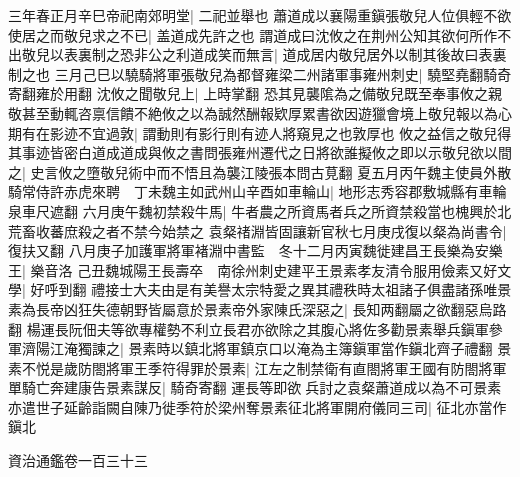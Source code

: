 三年春正月辛巳帝祀南郊明堂|{
	二祀並舉也}
蕭道成以襄陽重鎭張敬兒人位俱輕不欲使居之而敬兒求之不已|{
	盖道成先許之也}
謂道成曰沈攸之在荆州公知其欲何所作不出敬兒以表裏制之恐非公之利道成笑而無言|{
	道成居内敬兒居外以制其後故曰表裏制之也}
三月己巳以驍騎將軍張敬兒為都督雍梁二州諸軍事雍州刺史|{
	驍堅堯翻騎奇寄翻雍於用翻}
沈攸之聞敬兒上|{
	上時掌翻}
恐其見襲隂為之備敬兒既至奉事攸之親敬甚至動輒咨禀信饋不絶攸之以為誠然酬報欵厚累書欲因遊獵會境上敬兒報以為心期有在影迹不宜過敦|{
	謂動則有影行則有迹人將窺見之也敦厚也}
攸之益信之敬兒得其事迹皆密白道成道成與攸之書問張雍州遷代之日將欲誰擬攸之即以示敬兒欲以間之|{
	史言攸之墮敬兒術中而不悟且為襲江陵張本問古莧翻}
夏五月丙午魏主使員外散騎常侍許赤虎來聘　丁未魏主如武州山辛酉如車輪山|{
	地形志秀容郡敷城縣有車輪泉車尺遮翻}
六月庚午魏初禁殺牛馬|{
	牛者農之所資馬者兵之所資禁殺當也槐興於北荒畜收蕃庶殺之者不禁今始禁之}
袁粲禇淵皆固讓新官秋七月庚戌復以粲為尚書令|{
	復扶又翻}
八月庚子加護軍將軍褚淵中書監　冬十二月丙寅魏徙建昌王長樂為安樂王|{
	樂音洛}
己丑魏城陽王長壽卒　南徐州刺史建平王景素孝友清令服用儉素又好文學|{
	好呼到翻}
禮接士大夫由是有美譽太宗特愛之異其禮秩時太祖諸子俱盡諸孫唯景素為長帝凶狂失德朝野皆屬意於景素帝外家陳氏深惡之|{
	長知两翻屬之欲翻惡烏路翻}
楊運長阮佃夫等欲專權勢不利立長君亦欲除之其腹心將佐多勸景素舉兵鎭軍參軍濟陽江淹獨諫之|{
	景素時以鎮北將軍鎮京口以淹為主簿鎭軍當作鎭北齊子禮翻}
景素不悦是歲防閤將軍王季符得罪於景素|{
	江左之制禁衛有直閤將軍王國有防閤將軍}
單騎亡奔建康告景素謀反|{
	騎奇寄翻}
運長等即欲兵討之袁粲蕭道成以為不可景素亦遣世子延齡詣闕自陳乃徙季符於梁州奪景素征北將軍開府儀同三司|{
	征北亦當作鎭北}


資治通鑑卷一百三十三
